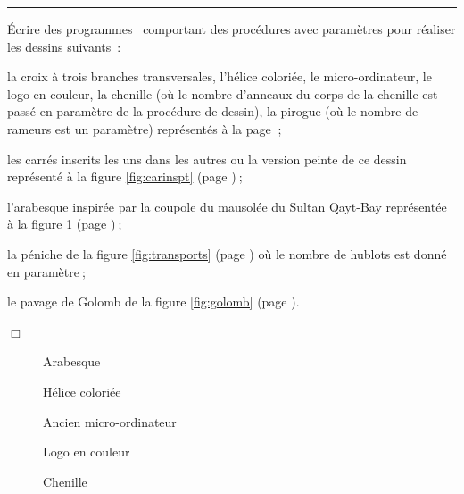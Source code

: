 \noindent \rule{137mm}{0.1mm} %
\begin{exercices}{Écrire des programmes \pascal\ comportant des procédures avec
paramètres pour réaliser les dessins suivants~:

\tiret la croix à trois branches transversales, l'hélice coloriée, le mi\-cro-\-or\-di\-na\-teur,
le logo en couleur, la chenille (où le nombre
d'anneaux du corps de la chenille est passé en paramètre de la procédure de dessin), la pirogue 
(où le nombre de rameurs est un paramètre) représentés à la page \pageref{fig:crx3b}$\:$;

\tiret les carrés inscrits les uns dans les autres
ou la version peinte de ce dessin représenté à la figure \ref{fig:carinspt} (page \pageref{fig:carinspt})$\:$;

\tiret l'arabesque inspirée par la coupole du mausolée du Sultan
         Qayt-\-Bay re\-pré\-sen\-tée à la figure \ref{fig:arab2} (page \pageref{fig:arab2})$\:$;

\tiret la péniche de la figure \ref{fig:transports} (page \pageref{fig:transports}) où le nombre
         de hublots est donné en paramètre$\:$;

\tiret le pavage de Golomb de la figure \ref{fig:golomb} (page \pageref{fig:golomb}).

\noindent $\Box$}\end{exercices}
\twocolumn
\begin{figure}[h]
 \caption{Arabesque}\label{fig:arab2}
\end{figure}
\vfill
\begin{figure}[h]
 \caption{Hélice coloriée}
\end{figure}
\vfill
\begin{figure}[h]
 \caption{Ancien micro-ordinateur}
\end{figure}
\mbox{}
\newpage
\begin{figure}[!h]
%
\caption{Logo en couleur}%
\end{figure}
\begin{figure}[!h]
%
\caption{Chenille}%
\end{figure}
